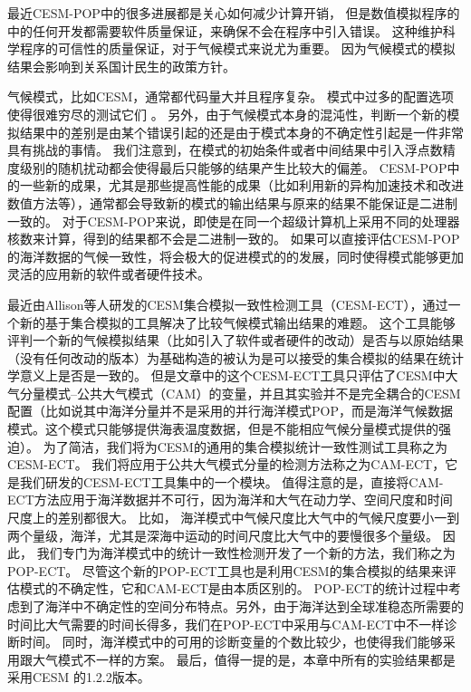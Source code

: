 最近CESM-POP中的很多进展都是关心如何减少计算开销\cite{yong2015}， 但是数值模拟程序的中的任何开发都需要软件质量保证，来确保不会在程序中引入错误。 
这种维护科学程序的可信性的质量保证，对于气候模式来说尤为重要。 
因为气候模式的模拟结果会影响到关系国计民生的政策方针\cite{carson2002, easterbrook2011}。 

  
气候模式，比如CESM，通常都代码量大并且程序复杂。 模式中过多的配置选项使得很难穷尽的测试它们 \cite{clune2011, pipitone2012}。 
另外，由于气候模式本身的混沌性，判断一个新的模拟结果中的差别是由某个错误引起的还是由于模式本身的不确定性引起是一件非常具有挑战的事情。 
我们注意到，在模式的初始条件或者中间结果中引入浮点数精度级别的随机扰动都会使得最后只能够的结果产生比较大的偏差。
CESM-POP中的一些新的成果，尤其是那些提高性能的成果（比如利用新的异构加速技术和改进数值方法等），通常都会导致新的模式的输出结果与原来的结果不能保证是二进制一致的。 
对于CESM-POP来说，即使是在同一个超级计算机上采用不同的处理器核数来计算，得到的结果都不会是二进制一致的。 
如果可以直接评估CESM-POP的海洋数据的气候一致性，将会极大的促进模式的的发展，同时使得模式能够更加灵活的应用新的软件或者硬件技术。 


最近由Allison等人\cite{baker2015}研发的CESM集合模拟一致性检测工具（CESM-ECT），通过一个新的基于集合模拟的工具解决了比较气候模式输出结果的难题。 
这个工具能够评判一个新的气候模拟结果（比如引入了软件或者硬件的改动）是否与以原始结果（没有任何改动的版本）为基础构造的被认为是可以接受的集合模拟的结果在统计学意义上是否是一致的。 
但是文章\cite{baker2015}中的这个CESM-ECT工具只评估了CESM中大气分量模式--公共大气模式（CAM）的变量，并且其实验并不是完全耦合的CESM配置（比如说其中海洋分量并不是采用的并行海洋模式POP，而是海洋气候数据模式。这个模式只能够提供海表温度数据，但是不能相应气候分量模式提供的强迫）。 
为了简洁，我们将为CESM的通用的集合模拟统计一致性测试工具称之为CESM-ECT。 
我们将应用于公共大气模式分量的检测方法称之为CAM-ECT，它是我们研发的CESM-ECT工具集中的一个模块。 
值得注意的是，直接将CAM-ECT方法应用于海洋数据并不可行，因为海洋和大气在动力学、空间尺度和时间尺度上的差别都很大。
比如， 海洋模式中气候尺度比大气中的气候尺度要小一到两个量级，海洋，尤其是深海中运动的时间尺度比大气中的要慢很多个量级。
因此， 我们专门为海洋模式中的统计一致性检测开发了一个新的方法，我们称之为POP-ECT。 
尽管这个新的POP-ECT工具也是利用CESM的集合模拟的结果来评估模式的不确定性，它和CAM-ECT是由本质区别的。 
POP-ECT的统计过程中考虑到了海洋中不确定性的空间分布特点。另外，由于海洋达到全球准稳态所需要的时间比大气需要的时间长得多，我们在POP-ECT中采用与CAM-ECT中不一样诊断时间。 
同时，海洋模式中的可用的诊断变量的个数比较少，也使得我们能够采用跟大气模式不一样的方案。 
最后，值得一提的是，本章中所有的实验结果都是采用CESM 的1.2.2版本。


